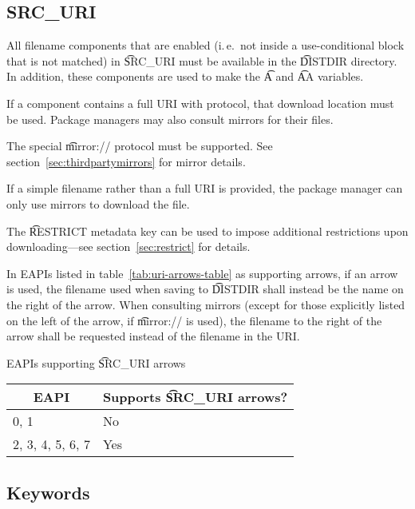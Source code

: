 \subsection{SRC_URI}
\label{sec:src-uri-behaviour}

All filename components that are enabled (i.\,e.\ not inside a use-conditional block that is not
matched) in \t{SRC_URI} must be available in the \t{DISTDIR} directory. In addition, these
components are used to make the \t{A} and \t{AA} variables.

If a component contains a full URI with protocol, that download location must be used. Package
managers may also consult mirrors for their files.

The special \t{mirror://} protocol must be supported. See section~\ref{sec:thirdpartymirrors} for
mirror details.

If a simple filename rather than a full URI is provided, the package manager can only use mirrors
to download the file.

The \t{RESTRICT} metadata key can be used to impose additional restrictions upon downloading---see
section~\ref{sec:restrict} for details.

 In EAPIs listed in table~\ref{tab:uri-arrows-table} as supporting
arrows, if an arrow is used, the filename used when saving to \t{DISTDIR} shall instead be the name
on the right of the arrow. When consulting mirrors (except for those explicitly listed on the left
of the arrow, if \t{mirror://} is used), the filename to the right of the arrow shall be requested
instead of the filename in the URI.

\begin{centertable}{EAPIs supporting \t{SRC_URI} arrows}
    \label{tab:uri-arrows-table}
    \begin{tabular}{ll}
      \toprule
      \multicolumn{1}{c}{\textbf{EAPI}} &
      \multicolumn{1}{c}{\textbf{Supports \t{SRC_URI} arrows?}} \\
      \midrule
      0, 1              & No  \\
      2, 3, 4, 5, 6, 7  & Yes \\
      \bottomrule
    \end{tabular}
\end{centertable}

\subsection{Keywords}
\label{sec:keywords}

